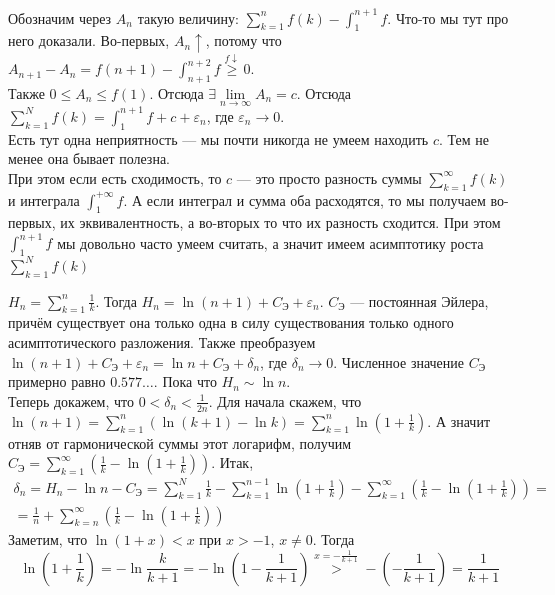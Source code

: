 \documentclass{article}
\begin{document}
\begin{itemize}
        \begin{Comment}
            Обозначим через $A_n$ такую величину: $\sum\limits_{k=1}^nf(k)-\int_1^{n+1}f$. Что-то мы тут про него доказали. Во-первых, $A_n\uparrow$, потому что $A_{n+1}-A_n=f(n+1)-\int_{n+1}^{n+2}f\overset{f\downarrow}\geqslant0$.\\
            Также $0\leqslant A_n\leqslant f(1)$. Отсюда $\exists\lim\limits_{n\to\infty}A_n=c$. Отсюда $\sum\limits_{k=1}^Nf(k)=\int_1^{n+1}f+c+\varepsilon_n$, где $\varepsilon_n\to0$.\\
            Есть тут одна неприятность --- мы почти никогда не умеем находить $c$. Тем не менее она бывает полезна.\\
            При этом если есть сходимость, то $c$ --- это просто разность суммы $\sum\limits_{k=1}^\infty f(k)$ и интеграла $\int_1^{+\infty}f$. А если интеграл и сумма оба расходятся, то мы получаем во-первых, их эквивалентность, а во-вторых то что их разность сходится. При этом $\int_1^{n+1}f$ мы довольно часто умеем считать, а значит имеем асимптотику роста $\sum\limits_{k=1}^N f(k)$
        \end{Comment}
        \begin{Example}
            $H_n=\sum\limits_{k=1}^n \frac1k$. Тогда $H_n=\ln(n+1)+C_{\text{Э}}+\varepsilon_n$. $C_{\text{Э}}$ --- постоянная Эйлера, причём существует она только одна в силу существования только одного асимптотического разложения. Также преобразуем $\ln(n+1)+C_{\text{Э}}+\varepsilon_n=\ln n+C_{\text{Э}}+\delta_n$, где $\delta_n\to0$. Численное значение $C_{\text{Э}}$ примерно равно $0.577\ldots$. Пока что $H_n\sim\ln n$.\\
            Теперь докажем, что $0<\delta_n<\frac1{2n}$. Для начала скажем, что $\ln(n+1)=\sum\limits_{k=1}^n(\ln(k+1)-\ln k)=\sum\limits_{k=1}^n\ln\left(1+\frac1k\right)$. А значит отняв от гармонической суммы этот логарифм, получим $C_{\text{Э}}=\sum\limits_{k=1}^\infty\left(\frac1k-\ln\left(1+\frac1k\right)\right)$. Итак,
            \[
            \begin{split}
                \delta_n=H_n-\ln n-C_{\text{Э}}=\sum\limits_{k=1}^N\frac1k-\sum\limits_{k=1}^{n-1}\ln\left(1+\frac1k\right)-\sum\limits_{k=1}^\infty\left(\frac1k-\ln\left(1+\frac1k\right)\right)=\\
                =\frac1n+\sum\limits_{k=n}^\infty\left(\frac1k-\ln\left(1+\frac1k\right)\right)
            \end{split}
            \]
            Заметим, что $\ln(1+x)<x$ при $x>-1$, $x\neq0$. Тогда
            $$\ln\left(1+\frac1k\right)=-\ln\frac{k}{k+1}=-\ln\left(1-\frac1{k+1}\right)\overset{x=-\frac1{k+1}}>-\left(-\frac1{k+1}\right)=\frac1{k+1}$$

\end{Example}
\end{itemize}
\end{document}
